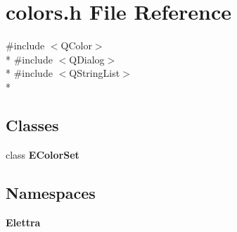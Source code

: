\section{colors.\+h File Reference}
\label{bk3_2colors_8h}
{\ttfamily \#include $<$Q\+Color$>$}\\*
{\ttfamily \#include $<$Q\+Dialog$>$}\\*
{\ttfamily \#include $<$Q\+String\+List$>$}\\*
\subsection*{Classes}
\begin{DoxyCompactItemize}
\item 
class {\bf E\+Color\+Set}
\end{DoxyCompactItemize}
\subsection*{Namespaces}
\begin{DoxyCompactItemize}
\item 
 {\bf Elettra}
\end{DoxyCompactItemize}
